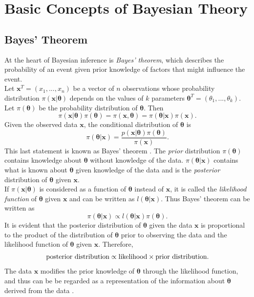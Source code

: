 \section{Basic Concepts of Bayesian Theory}
\subsection{Bayes' Theorem}
At the heart of Bayesian inference is \textit{Bayes' theorem}, which describes the probability of an event given prior knowledge of factors that might influence the event. \\
Let $\pmb{x}^T=\left(x_1,...,x_n\right)$ be a vector of $n$ observations whose probability distribution $\pi\left(\pmb{x}|\pmb{\theta}\right)$ depends on the values of $k$ parameters $\pmb{\theta}^T=\left(\theta_1,...,\theta_k\right)$. Let $\pi\left(\pmb{\theta}\right)$ be the probability distribution of $\pmb{\pmb{\theta}}$. Then 
\begin{equation}
    \pi\left(\pmb{x}|\pmb{\theta}\right)\pi\left(\pmb{\theta}\right)=\pi\left(\pmb{x},\pmb{\theta}\right) = \pi\left(\pmb{\theta}|\pmb{x}\right)\pi\left(\pmb{x}\right).
\end{equation}
Given the observed data $\pmb{x}$, the conditional distribution of $\pmb{\theta}$ is
\begin{equation}
    \pi\left(\pmb{\theta}|\pmb{x}\right)=\frac{p\left(\pmb{x}|\pmb{\theta}\right)\pi\left(\pmb{\theta}\right)}{\pi\left(\pmb{x}\right)}.
\end{equation}
This last statement is known as Bayes' theorem \autocite[][]{bayes1763lii}. The \textit{prior} distribution $\pi\left(\pmb{\theta}\right)$ contains knowledge about $\pmb{\theta}$ without knowledge of the data. $\pi\left(\pmb{\theta}|\pmb{x}\right)$ contains what is known about $\pmb{\theta}$ given knowledge of the data and is the \textit{posterior} distribution of $\pmb{\theta}$ given $\pmb{x}$. \\
If $\pi\left(\pmb{x}|\pmb{\theta}\right)$ is considered as a function of $\pmb{\theta}$ instead of $\pmb{x}$, it is called the \textit{likelihood function} of $\pmb{\theta}$ given $\pmb{x}$ and can be written as $l\left(\pmb{\theta}|\pmb{x}\right)$. Thus Bayes' theorem can be written as
\begin{equation}
    \pi\left(\pmb{\theta}|\pmb{x}\right)\propto l\left(\pmb{\theta}|\pmb{x}\right)\pi\left(\pmb{\theta}\right).
\end{equation}
It is evident that the posterior distribution of $\pmb{\theta}$ given the data $\pmb{x}$ is proportional to the product of the distribution of $\pmb{\theta}$ prior to observing the data and the likelihood function of $\pmb{\theta}$ given $\pmb{x}$. Therefore,
\begin{equation*}
    \hbox{posterior distribution} \propto  \hbox{likelihood}\times\hbox{prior distribution}.
\end{equation*}
The data $\pmb{x}$ modifies the prior knowledge of $\pmb{\theta}$ through the likelihood function, and thus can be be regarded as a representation of the information about  $\pmb{\theta}$ derived from the data \autocite[][]{box2011bayesian}.
